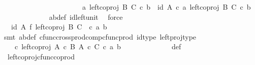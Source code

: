 \begin{isabellebody}
\ \ \ \ \ \ \ \ \isamarkupfalse%
\ {\isacharminus}{\kern0pt}\ \isanewline
\ \ \ \ \ \ \ \ \ \ \isamarkupfalse%
\ {\isachardoublequoteopen}{\isasymlangle}a{\isacharcomma}{\kern0pt}\ left{\isacharunderscore}{\kern0pt}coproj\ B\ C\ {\isasymcirc}\isactrlsub c\ b{\isasymrangle}\ {\isacharequal}{\kern0pt}\ {\isasymlangle}id\ A\ {\isasymcirc}\isactrlsub c\ a{\isacharcomma}{\kern0pt}\ left{\isacharunderscore}{\kern0pt}coproj\ B\ C\ {\isasymcirc}\isactrlsub c\ b{\isasymrangle}{\isachardoublequoteclose}\isanewline
\ \ \ \ \ \ \ \ \ \ \ \ \isamarkupfalse%
\ ab{\isacharunderscore}{\kern0pt}def\ id{\isacharunderscore}{\kern0pt}left{\isacharunderscore}{\kern0pt}unit{}\ \isamarkupfalse%
\ force\isanewline
\ \ \ \ \ \ \ \ \ \ \isamarkupfalse%
\ \isamarkupfalse%
\ {\isachardoublequoteopen}{\isachardot}{\kern0pt}{\isachardot}{\kern0pt}{\isachardot}{\kern0pt}\ {\isacharequal}{\kern0pt}\ {\isacharparenleft}{\kern0pt}id\ A\ {\isasymtimes}\isactrlsub f\ left{\isacharunderscore}{\kern0pt}coproj\ B\ C{\isacharparenright}{\kern0pt}\ \ {\isasymcirc}\isactrlsub c\ {\isasymlangle}a{\isacharcomma}{\kern0pt}\ b{\isasymrangle}{\isachardoublequoteclose}\isanewline
\ \ \ \ \ \ \ \ \ \ \ \ \isamarkupfalse%
\ {\isacharparenleft}{\kern0pt}smt\ ab{\isacharunderscore}{\kern0pt}def\ cfunc{\isacharunderscore}{\kern0pt}cross{\isacharunderscore}{\kern0pt}prod{\isacharunderscore}{\kern0pt}comp{\isacharunderscore}{\kern0pt}cfunc{\isacharunderscore}{\kern0pt}prod\ id{\isacharunderscore}{\kern0pt}type\ left{\isacharunderscore}{\kern0pt}proj{\isacharunderscore}{\kern0pt}type{\isacharparenright}{\kern0pt}\isanewline
\ \ \ \ \ \ \ \ \ \ \isamarkupfalse%
\ \isamarkupfalse%
\ {\isachardoublequoteopen}{\isachardot}{\kern0pt}{\isachardot}{\kern0pt}{\isachardot}{\kern0pt}\ {\isacharequal}{\kern0pt}\ {\isacharparenleft}{\kern0pt}{\isasymphi}\ {\isasymcirc}\isactrlsub c\ left{\isacharunderscore}{\kern0pt}coproj\ {\isacharparenleft}{\kern0pt}A\ {\isasymtimes}\isactrlsub c\ B{\isacharparenright}{\kern0pt}\ {\isacharparenleft}{\kern0pt}A\ {\isasymtimes}\isactrlsub c\ C{\isacharparenright}{\kern0pt}{\isacharparenright}{\kern0pt}\ {\isasymcirc}\isactrlsub c\ {\isasymlangle}a{\isacharcomma}{\kern0pt}\ b{\isasymrangle}{\isachardoublequoteclose}\isanewline
\ \ \ \ \ \ \ \ \ \ \ \ \isamarkupfalse%
\ {\isasymphi}{\isacharunderscore}{\kern0pt}def\ \isamarkupfalse%
\ \ left{\isacharunderscore}{\kern0pt}coproj{\isacharunderscore}{\kern0pt}cfunc{\isacharunderscore}{\kern0pt}coprod\ \isamarkupfalse%

\end{isabellebody}
